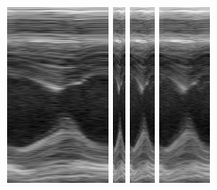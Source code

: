 \documentclass[journal]{IEEEtran}
\begin{document}
\begin{figure}[t]
\hspace{0.02cm}
\includegraphics[height=2.05in]
{figures/decoded/2015-07-27-10-36-06_2015-07-15-16-56-16_1.raw.bmode/Input_Mag_8_kernel_regression_phase_sim.png}
\hspace{1.0cm}
\includegraphics[height=2.05in]{figures/decoded/2015-07-27-10-36-06_2015-07-15-16-56-16_1.raw.bmode/Input_Mag_1_kernel_regression_phase.png}
\hspace{0.02cm}
\includegraphics[height=2.05in]{figures/decoded/2015-07-27-10-36-06_2015-07-15-16-56-16_1.raw.bmode/Input_Mag_2_kernel_regression_phase.png}
\hspace{0.02cm}
\includegraphics[height=2.05in]{figures/decoded/2015-07-27-10-36-06_2015-07-15-16-56-16_1.raw.bmode/Input_Mag_4_kernel_regression_phase.png}

\end{figure}
\end{document}
